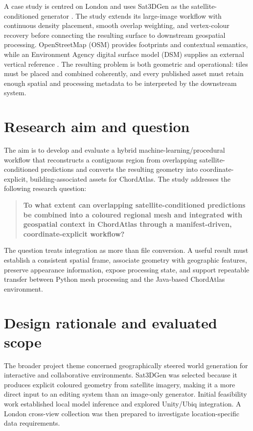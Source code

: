 A case study is centred on London and uses Sat3DGen as the
satellite-conditioned generator \cite{qian2026sat3dgen}.  The study extends its large-image workflow with continuous density placement, smooth
overlap weighting, and vertex-colour recovery before connecting the resulting
surface to downstream geospatial processing.  OpenStreetMap (OSM)
provides footprints and contextual semantics, while an Environment Agency
digital surface model (DSM) supplies an external vertical reference
\cite{openstreetmapData,environmentAgencyDSM2022}.  The resulting problem is
both geometric and operational: tiles must be placed and combined coherently,
and every published asset must retain enough spatial and processing metadata
to be interpreted by the downstream system.

\section{Research aim and question}

The aim is to develop and evaluate a hybrid machine-learning/procedural
workflow that reconstructs a contiguous region from overlapping
satellite-conditioned predictions and converts the resulting geometry into
coordinate-explicit, building-associated assets for ChordAtlas.  The study
addresses the following research question:

\begin{quote}
\textbf{To what extent can overlapping satellite-conditioned predictions be
combined into a coloured regional mesh and integrated with geospatial context
in ChordAtlas through a manifest-driven, coordinate-explicit workflow?}
\end{quote}

The question treats integration as more than file conversion.  A useful result
must establish a consistent spatial frame, associate geometry with geographic
features, preserve appearance information, expose processing state, and
support repeatable transfer between Python mesh processing and the Java-based
ChordAtlas environment.

\section{Design rationale and evaluated scope}

The broader project theme concerned geographically steered world generation
for interactive and collaborative environments.  Sat3DGen was selected because
it produces explicit coloured geometry from satellite imagery, making it a
more direct input to an editing system than an image-only generator.  Initial
feasibility work established local model inference and explored Unity/Ubiq
integration.  A London cross-view collection was then prepared to investigate
location-specific data requirements.

